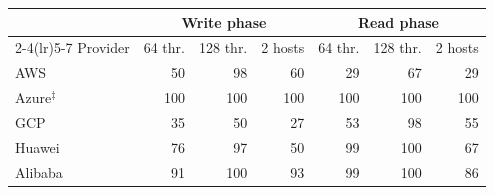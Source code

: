 \begin{tabular}{lrrrrrr}
\toprule
 & \multicolumn{3}{c}{Write phase} & \multicolumn{3}{c}{Read phase} \\
\cmidrule(lr){2-4}\cmidrule(lr){5-7}
Provider & 64 thr. & 128 thr. & 2 hosts & 64 thr. & 128 thr. & 2 hosts \\
\midrule
AWS & 50 & 98 & 60 & 29 & 67 & 29 \\
Azure$^{\ddagger}$ & 100 & 100 & 100 & 100 & 100 & 100 \\
GCP & 35 & 50 & 27 & 53 & 98 & 55 \\
Huawei & 76 & 97 & 50 & 99 & 100 & 67 \\
Alibaba & 91 & 100 & 93 & 99 & 100 & 86 \\
\bottomrule
\end{tabular}
